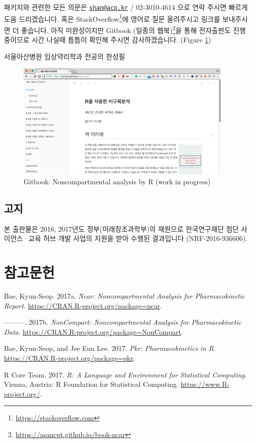 \documentclass[12pt,]{krantz}
\let\rmarkdownfootnote\footnote%
\def\footnote{\protect\rmarkdownfootnote}
\begin{document}
패키지와 관련한 모든 의문은
\href{mailto:shan@acp.kr}{\nolinkurl{shan@acp.kr}} / 02-3010-4614 으로
연락 주시면 빠르게 도움 드리겠습니다. 혹은 StackOverflow\footnote{\url{https://stackoverflow.com}}에
영어로 질문 올려주시고 링크를 보내주시면 더 좋습니다. 아직 미완성이지만
Gitbook (일종의 웹북)\footnote{\url{https://asancpt.github.io/book-ncar}}을
통해 전자출판도 진행 중이므로 시간 나실때 틈틈이 확인해 주시면
감사하겠습니다. (Figure \ref{fig:gitbook})

서울아산병원 임상약리학과 전공의 한성필

\begin{figure}
\includegraphics[width=400px]{gitbook} \caption{Gitbook: Noncompartmental analysis by R (work in progress)}\label{fig:gitbook}
\end{figure}

\section{고지}

본 출판물은 2016, 2017년도 정부(미래창조과학부)의 재원으로 한국연구재단
첨단 사이언스·교육 허브 개발 사업의 지원을 받아 수행된 결과입니다
(NRF-2016-936606).

\chapter{참고문헌}

\hypertarget{refs}{}
\hypertarget{ref-R-ncar}{}
Bae, Kyun-Seop. 2017a. \emph{Ncar: Noncompartmental Analysis for
Pharmacokinetic Report}. \url{https://CRAN.R-project.org/package=ncar}.

\hypertarget{ref-R-NonCompart}{}
---------. 2017b. \emph{NonCompart: Noncompartmental Analysis for
Pharmacokinetic Data}.
\url{https://CRAN.R-project.org/package=NonCompart}.

\hypertarget{ref-R-pkr}{}
Bae, Kyun-Seop, and Jee Eun Lee. 2017. \emph{Pkr: Pharmacokinetics in
R}. \url{https://CRAN.R-project.org/package=pkr}.

\hypertarget{ref-R-base}{}
R Core Team. 2017. \emph{R: A Language and Environment for Statistical
Computing}. Vienna, Austria: R Foundation for Statistical Computing.
\url{https://www.R-project.org/}.
\end{document}
